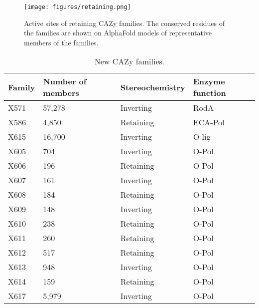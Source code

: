 \documentclass{article}
\begin{document}
\begin{figure}[htbp]
    \centering
    \texttt{[image: figures/retaining.png]}
    \caption{Active sites of retaining CAZy families. The conserved residues of the families are shown on AlphaFold models of representative members of the families.}
    \label{fig:retaining-active-sites}
\end{figure}

\begin{table}[!ht]
    \centering
    \begin{tabular}{|l|l|l|l|}
    \hline
        Family & Number of members & Stereochemistry & Enzyme function \\ \hline
        X571 & 57,278 & Inverting & RodA \\ \hline
        X586 & 4,850 & Retaining & ECA-Pol \\ \hline
        X615 & 16,700 & Inverting & O-lig \\ \hline
        X605 & 704 & Inverting & O-Pol \\ \hline
        X606 & 196 & Retaining & O-Pol \\ \hline
        X607 & 161 & Inverting & O-Pol \\ \hline
        X608 & 184 & Retaining & O-Pol \\ \hline
        X609 & 148 & Inverting & O-Pol \\ \hline
        X610 & 238 & Retaining & O-Pol \\ \hline
        X611 & 260 & Retaining & O-Pol \\ \hline
        X612 & 517 & Retaining & O-Pol \\ \hline
        X613 & 948 & Inverting & O-Pol \\ \hline
        X614 & 159 & Retaining & O-Pol \\ \hline
        X617 & 5,979 & Inverting & O-Pol \\ \hline
    \end{tabular}
    \caption{New CAZy families.}
    \label{tab:families}
\end{table}
\end{document}
